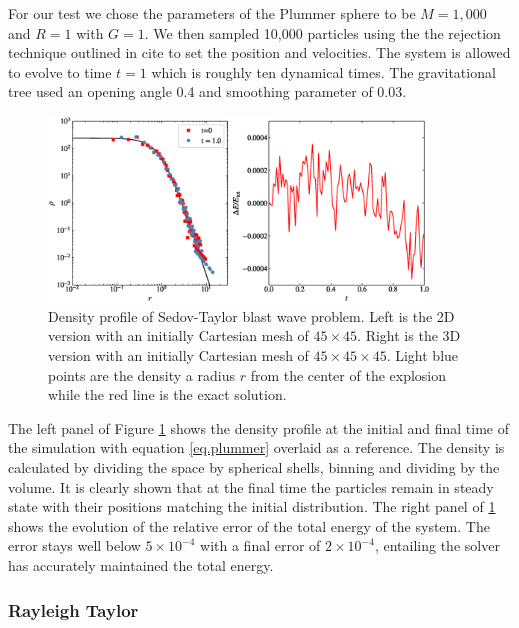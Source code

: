 For our test we chose the parameters of the Plummer sphere to be $M=1,000$ and $R=1$ with
$G=1$. We then sampled 10,000 particles using the the rejection technique outlined in
cite to set the position and velocities. The system is allowed to evolve to time $t=1$
which is roughly ten dynamical times. The gravitational tree used an opening angle 0.4
and smoothing parameter of 0.03.
\begin{figure}
    \begin{center}
        \includegraphics[width=0.9\textwidth]{figures/plummer.eps}
        \caption{Density profile of Sedov-Taylor blast wave problem. Left is the 2D version with an initially
        Cartesian mesh of $45 \times 45$. Right is the 3D version with an initially Cartesian mesh of 
        $45 \times 45 \times 45$. Light blue points are the density a radius $r$ from the center of the explosion
        while the red line is the exact solution.}
        \label{fig.plummer}
    \end{center}
\end{figure}
The left panel of Figure \ref{fig.plummer} shows the density profile at the initial and final 
time of the simulation with equation \ref{eq.plummer} overlaid as a reference. The density is calculated
by dividing the space by spherical shells, binning and dividing by the volume. It is clearly shown that
at the final time the particles remain in steady state with their positions matching the initial
distribution. The right panel of \ref{fig.plummer} shows the evolution of the relative error of the
total energy of the system. The error stays well below $5\times 10^{-4}$ with a final error of
$2\times 10^{-4}$, entailing the solver has accurately maintained the total energy.

\subsubsection{Rayleigh Taylor}

